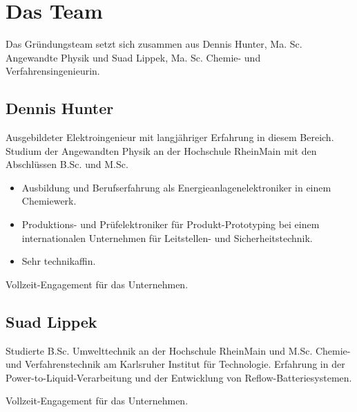 \chapter{Das Team}

Das Gründungsteam setzt sich zusammen aus Dennis Hunter, Ma. Sc. Angewandte Physik und Suad Lippek, Ma. Sc. Chemie- und Verfahrensingenieurin.

\section{Dennis Hunter}

Ausgebildeter Elektroingenieur mit langjähriger Erfahrung in diesem Bereich.
Studium der Angewandten Physik an der Hochschule RheinMain mit den Abschlüssen B.Sc. und M.Sc.
\begin{itemize}
    \item Ausbildung und Berufserfahrung als Energieanlagenelektroniker in einem Chemiewerk.
    \item Produktions- und Prüfelektroniker für Produkt-Prototyping bei einem internationalen Unternehmen für Leitstellen- und Sicherheitstechnik.
    \item Sehr technikaffin.
\end{itemize}
Vollzeit-Engagement für das Unternehmen.


\section{Suad Lippek}

Studierte B.Sc. Umwelttechnik an der Hochschule RheinMain und M.Sc. Chemie- und Verfahrenstechnik am Karlsruher Institut für Technologie.
Erfahrung in der Power-to-Liquid-Verarbeitung und der Entwicklung von Reflow-Batteriesystemen.

Vollzeit-Engagement für das Unternehmen.